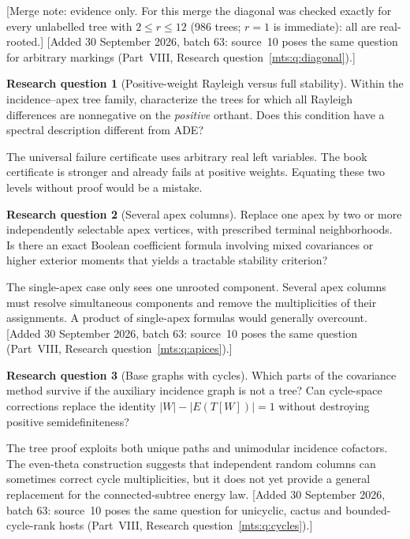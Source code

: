 \documentclass[11pt]{article}
\numberwithin{equation}{section}
\theoremstyle{definition}
\newtheorem{question}{Research question}%
\begin{document}
[Merge note: evidence only. For this merge the diagonal was checked
exactly for every unlabelled tree with $2\le r\le12$ (986 trees; $r=1$ is
immediate): all are real-rooted.]
[Added 30 September 2026, batch 63: source~10 poses the same question for
arbitrary markings (Part~VIII, Research question~\ref{mts:q:diagonal}).]

\begin{question}[Positive-weight Rayleigh versus full stability]
Within the incidence--apex tree family, characterize the trees for which
all Rayleigh differences are nonnegative on the \emph{positive} orthant.
Does this condition have a spectral description different from ADE?
\end{question}
The universal failure certificate uses arbitrary real left variables.
The book certificate is stronger and already fails at positive weights.
Equating these two levels without proof would be a mistake.

\begin{question}[Several apex columns]\label{mts:hq:apices}
Replace one apex by two or more independently selectable apex vertices,
with prescribed terminal neighborhoods.  Is there an exact Boolean
coefficient formula involving mixed covariances or higher exterior
moments that yields a tractable stability criterion?
\end{question}
The single-apex case only sees one unrooted component.  Several apex
columns must resolve simultaneous components and remove the
multiplicities of their assignments.  A product of single-apex formulas
would generally overcount.
[Added 30 September 2026, batch 63: source~10 poses the same question
(Part~VIII, Research question~\ref{mts:q:apices}).]

\begin{question}[Base graphs with cycles]\label{mts:hq:cycles}
Which parts of the covariance method survive if the auxiliary incidence
graph is not a tree?  Can cycle-space corrections replace the identity
$|W|-|E(T[W])|=1$ without destroying positive semidefiniteness?
\end{question}
The tree proof exploits both unique paths and unimodular incidence
cofactors.  The even-theta construction suggests that independent random
columns can sometimes correct cycle multiplicities, but it does not
yet provide a general replacement for the connected-subtree energy law.
[Added 30 September 2026, batch 63: source~10 poses the same question for
unicyclic, cactus and bounded-cycle-rank hosts (Part~VIII, Research
question~\ref{mts:q:cycles}).]
\end{document}
